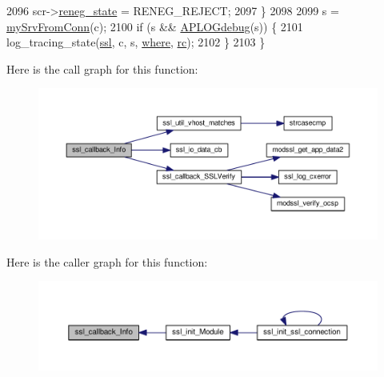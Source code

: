\begin{DoxyCode}
2096         scr->\hyperlink{structSSLConnRec_ad36678f508db0c5a628b6a99a76bf3c0}{reneg\_state} = RENEG\_REJECT;
2097     \}
2098 
2099     s = \hyperlink{group__MOD__SSL__PRIVATE_ga20a45d64a09acadc21debea6057f62a8}{mySrvFromConn}(c);
2100     \textcolor{keywordflow}{if} (s && \hyperlink{group__APACHE__CORE__LOG_ga621be6f226bfc0c27955674a8106df5e}{APLOGdebug}(s)) \{
2101         log\_tracing\_state(\hyperlink{group__MOD__SSL_ga91d808d6c1c01029f9c9260b9b69a437}{ssl}, c, s, \hyperlink{group__apr__file__io_ga36413100270e49e571f3f52170bc5a1f}{where}, \hyperlink{group__APACHE__CORE__CONFIG_ga2e051c0ce9ee165170cd7973f2464512}{rc});
2102     \}
2103 \}
\end{DoxyCode}


Here is the call graph for this function\+:
\nopagebreak
\begin{figure}[H]
\begin{center}
\leavevmode
\includegraphics[width=350pt]{group__MOD__SSL__PRIVATE_gaad15af9d93ac03e2acdbe6a8d1d76adb_cgraph}
\end{center}
\end{figure}




Here is the caller graph for this function\+:
\nopagebreak
\begin{figure}[H]
\begin{center}
\leavevmode
\includegraphics[width=350pt]{group__MOD__SSL__PRIVATE_gaad15af9d93ac03e2acdbe6a8d1d76adb_icgraph}
\end{center}
\end{figure}


